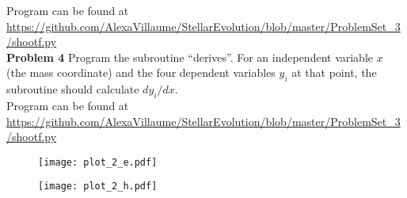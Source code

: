 \documentclass[12pt]{article}
\begin{document}
\noindent Program can be found at \url{https://github.com/AlexaVillaume/StellarEvolution/blob/master/ProblemSet_3/shootf.py} \\

\noindent \textbf{Problem 4} Program the subroutine ``derives''. For an independent variable $x$ (the mass coordinate) and the four dependent variables $y_i$ at that point, the subroutine should calculate $dy_i/dx$. \\

\noindent Program can be found at \url{https://github.com/AlexaVillaume/StellarEvolution/blob/master/ProblemSet_3/shootf.py} \\

\begin{figure}[b]
  \vspace{-30pt}
  \begin{center}
    \texttt{[image: plot\_2\_e.pdf]}
  \end{center}
  \vspace{-20pt}
  \vspace{-15pt}
\end{figure}  %
 
 
 \begin{figure}[t]
  \vspace{-30pt}
  \begin{center}
    \texttt{[image: plot\_2\_h.pdf]}
  \end{center}
  \vspace{-20pt}
  \vspace{-15pt}
\end{figure}  %
 
\end{document}
